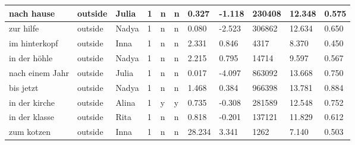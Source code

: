 \begin{longtable}{|p{4cm}|p{1cm}|p{1.2cm}|p{0.5cm}|p{0.5cm}|p{0.5cm}|R{1cm}|R{1cm}|R{1cm}|R{1cm}|R{1cm}|}
nach hause                 & outside           & Julia         & 1                                   & n                          & n                          & 0.327      & -1.118        & 230408                  & 12.348                        & 0.575                   \\ \hline
zur hilfe                  & outside           & Nadya         & 1                                   & n                          & n                          & 0.080      & -2.523        & 306862                  & 12.634                        & 0.650                   \\ \hline
im hinterkopf              & outside           & Inna          & 1                                   & n                          & n                          & 2.331      & 0.846         & 4317                    & 8.370                         & 0.450                   \\ \hline
in der h\"{o}hle           & outside           & Nadya         & 1                                   & n                          & n                          & 2.215      & 0.795         & 14714                   & 9.597                         & 0.567                   \\ \hline
nach einem Jahr            & outside           & Julia         & 1                                   & n                          & n                          & 0.017      & -4.097        & 863092                  & 13.668                        & 0.750                   \\ \hline
bis jetzt                  & outside           & Nadya         & 1                                   & n                          & n                          & 1.468      & 0.384         & 966398                  & 13.781                        & 0.884                   \\ \hline
in der kirche              & outside           & Alina         & 1                                   & y                          & y                          & 0.735      & -0.308        & 281589                  & 12.548                        & 0.752                   \\ \hline
in der klasse              & outside           & Rita          & 1                                   & n                          & n                          & 0.818      & -0.201        & 137121                  & 11.829                        & 0.612                   \\ \hline
zum kotzen                 & outside           & Inna          & 1                                   & n                          & n                          & 28.234     & 3.341         & 1262                    & 7.140                         & 0.503                   \\ \hline

\end{longtable}
